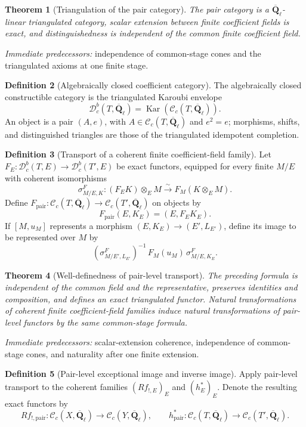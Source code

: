 \documentclass[10pt]{article}
\newtheorem{theorem}{Theorem}[section]
\theoremstyle{definition}
\newtheorem{definition}[theorem]{Definition}
\newcommand{\Qlb}{\overline{\mathbf Q}_\ell}
\newcommand{\Dbc}{\mathcal D^b_c}
\newcommand{\Kar}{\operatorname{Kar}}
\newcommand{\pred}[1]{\par\smallskip\begingroup\footnotesize\raggedright
\emph{Immediate predecessors:} #1.\par\endgroup}
\begin{document}
\begin{theorem}[Triangulation of the pair category]
The pair category is a \(\Qlb\)-linear triangulated category, scalar
extension between finite coefficient fields is exact, and distinguishedness is
independent of the common finite coefficient field.
\end{theorem}
\pred{independence of common-stage cones and the triangulated axioms at one finite stage}

\begin{definition}[Algebraically closed coefficient category]
The algebraically closed constructible category is the triangulated
Karoubi envelope
\[
 \Dbc(T,\Qlb)=\Kar(\mathcal C_c(T,\Qlb)).
\]
An object is a pair \((A,e)\), with
\(A\in\mathcal C_c(T,\Qlb)\) and \(e^2=e\); morphisms, shifts, and
distinguished triangles are those of the triangulated idempotent
completion.
\end{definition}

\begin{definition}[Transport of a coherent finite coefficient-field family]
Let \(F_E:\Dbc(T,E)\to\Dbc(T',E)\) be exact functors, equipped for every
finite \(M/E\) with coherent isomorphisms
\[
 \sigma^F_{M/E,K}:(F_EK)\otimes_EM
 \xrightarrow{\sim}F_M(K\otimes_EM).
\]
Define \(F_{\mathrm{pair}}:\mathcal C_c(T,\Qlb)\to
\mathcal C_c(T',\Qlb)\) on objects by
\[
 F_{\mathrm{pair}}(E,K_E)=(E,F_EK_E).
\]
If \([M,u_M]\) represents a morphism
\((E,K_E)\to(E',L_{E'})\), define its image to be represented over \(M\)
by
\[
 (\sigma^F_{M/E',L_{E'}})^{-1}\,F_M(u_M)\,
 \sigma^F_{M/E,K_E}.
\]
\end{definition}

\begin{theorem}[Well-definedness of pair-level transport]
The preceding formula is independent of the common field and the
representative, preserves identities and composition, and defines an exact
triangulated functor.  Natural transformations of coherent finite coefficient-field
families induce natural transformations of pair-level functors by the
same common-stage formula.
\end{theorem}
\pred{scalar-extension coherence, independence of common-stage cones, and naturality after one finite extension}

\begin{definition}[Pair-level exceptional image and inverse image]
Apply pair-level transport to the coherent families
\((Rf_{!,E})_E\) and \((h_E^*)_E\).  Denote the resulting exact functors by
\[
 Rf_{!,\mathrm{pair}}:
 \mathcal C_c(X,\Qlb)\to\mathcal C_c(Y,\Qlb),
 \qquad
 h^*_{\mathrm{pair}}:
 \mathcal C_c(T,\Qlb)\to\mathcal C_c(T',\Qlb).
\]
\end{definition}
\end{document}

